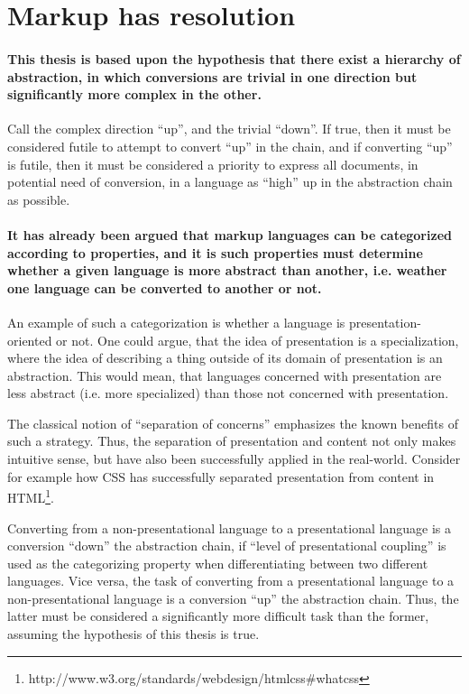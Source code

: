 \documentclass{scrreprt}
\begin{document}
\section{Markup has resolution}

\paragraph{This thesis is based upon the hypothesis that there exist a hierarchy of abstraction, in which conversions are trivial in one direction but significantly more complex in the other.} Call the complex direction ``up'', and the trivial ``down''. If true, then it must be considered futile to attempt to convert ``up'' in the chain, and if converting ``up'' is futile, then it must be considered a priority to express all documents, in potential need of conversion, in a language as ``high'' up in the abstraction chain as possible. 

\paragraph{It has already been argued that markup languages can be categorized according to properties, and it is such properties must determine whether a given language is more abstract than another, i.e. weather one language can be converted to another or not.}
An example of such a categorization is whether a language is presentation-oriented or not. One could argue, that the idea of presentation is a specialization, where the idea of describing a thing outside of its domain of presentation is an abstraction. This would mean, that languages concerned with presentation are less abstract (i.e. more specialized) than those not concerned with presentation.

The classical notion of ``separation of concerns'' emphasizes the known benefits of such a strategy. Thus, the separation of presentation and content not only makes intuitive sense, but have also been successfully applied in the real-world. Consider for example how CSS has successfully separated presentation from content in HTML\footnote{http://www.w3.org/standards/webdesign/htmlcss\#whatcss}.

Converting from a non-presentational language to a presentational language is a conversion ``down'' the abstraction chain, if ``level of presentational coupling'' is used as the categorizing property when differentiating between two different languages. Vice versa, the task of converting from a presentational language to a non-presentational language is a conversion ``up'' the abstraction chain. Thus, the latter must be considered a significantly more difficult task than the former, assuming the hypothesis of this thesis is true.
\end{document}
